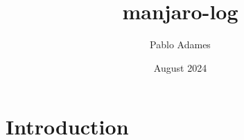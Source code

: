 \documentclass{article}
\title{manjaro-log}
\author{Pablo Adames}
\date{August 2024}
\begin{document}
\maketitle

\section{Introduction}
\end{document}
